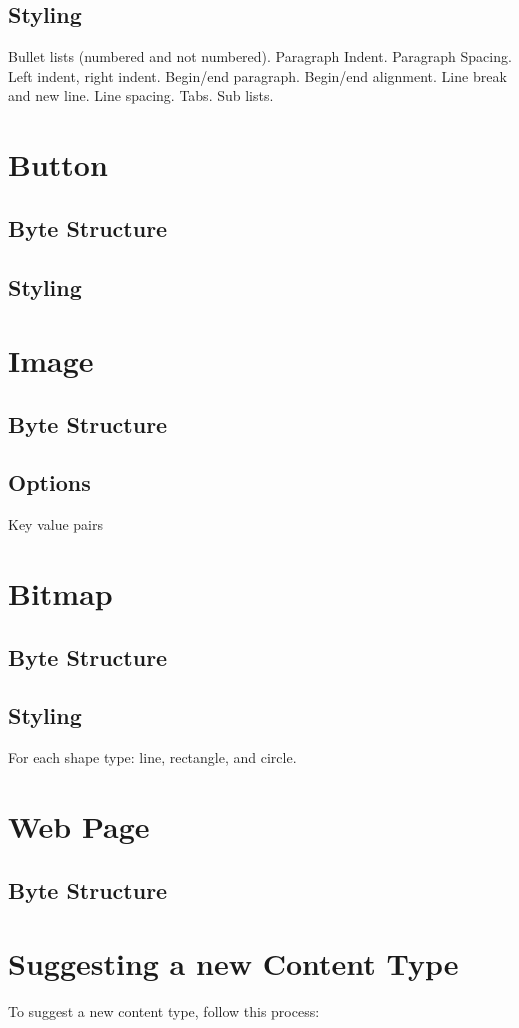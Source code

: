 \documentclass{report}
\begin{document}
\subsection{Styling}
Bullet lists (numbered and not numbered). Paragraph Indent. Paragraph Spacing. Left indent, right indent. Begin/end paragraph. Begin/end alignment. Line break and new line. Line spacing. Tabs. Sub lists.
\section{Button}
\subsection{Byte Structure}
\subsection{Styling}
\section{Image}
\subsection{Byte Structure}
\subsection{Options}
Key value pairs
\section{Bitmap}
\subsection{Byte Structure}
\subsection{Styling}
For each shape type: line, rectangle, and circle.
\section{Web Page}
\subsection{Byte Structure}
\section{Suggesting a new Content Type}
To suggest a new content type, follow this process:
\end{document}
